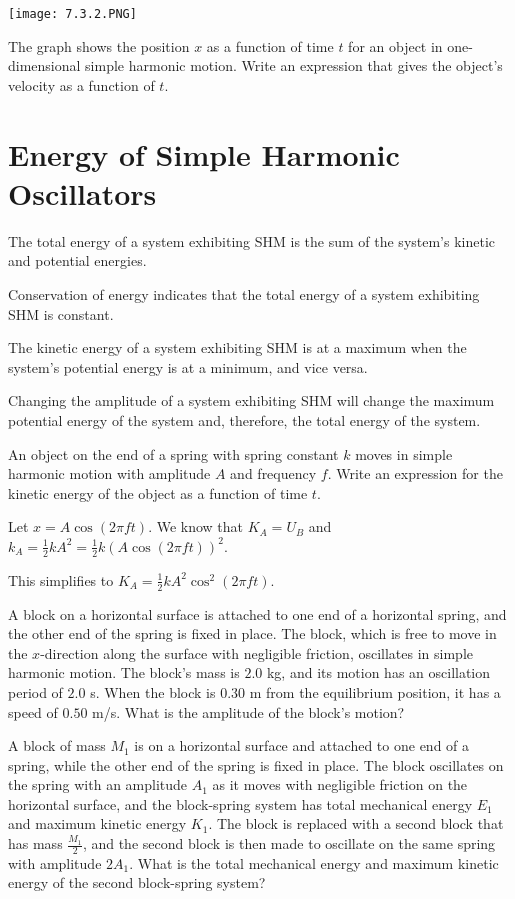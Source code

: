 \documentclass[../mech.tex]{subfiles}
\begin{document}
\ex 
\begin{center}
    \texttt{[image: 7.3.2.PNG]}
\end{center}
The graph shows the position $x$ as a function of time $t$ for an object in one-dimensional simple harmonic motion. Write an expression that gives the object's velocity as a function of $t$.

\section{Energy of Simple Harmonic Oscillators}
The total energy of a system exhibiting SHM is the sum of the system's kinetic and potential energies.

Conservation of energy indicates that the total energy of a system exhibiting SHM is constant.

The kinetic energy of a system exhibiting SHM is at a maximum when the system's potential energy is at a minimum, and vice versa.

Changing the amplitude of a system exhibiting SHM will change the maximum potential energy of the system and, therefore, the total energy of the system.

\begin{example}
    An object on the end of a spring with spring constant $k$ moves in simple harmonic motion with amplitude $A$ and frequency $f$. Write an expression for the kinetic energy of the object as a function of time $t$.

    Let $x=A\cos (2\pi ft)$. We know that $K_A=U_B$ and $k_A=\frac{1}{2}kA^2=\frac{1}{2}k(A\cos(2\pi ft))^2$.

    This simplifies to $K_A=\frac{1}{2}kA^2\cos^2 (2\pi ft)$.
\end{example}

\ex A block on a horizontal surface is attached to one end of a horizontal spring, and the other end of the spring is fixed in place. The block, which is free to move in the $x$-direction along the surface with negligible friction, oscillates in simple harmonic motion.
The block's mass is $2.0$ kg, and its motion has an oscillation period of $2.0$ s. When the block is $0.30$ m from the equilibrium position, it has a speed of $0.50$ m/s. What is the amplitude of the block's motion?

\pagebreak
\ex A block of mass $M_1$ is on a horizontal surface and attached to one end of a spring, while the other end of the spring is fixed in place. The block oscillates on the spring with an amplitude $A_1$ as it moves with negligible friction 
on the horizontal surface, and the block-spring system has total mechanical energy $E_1$ and maximum kinetic energy $K_1$. The block is replaced with a second block that has mass $\frac{M_1}{2}$, and the second block 
is then made to oscillate on the same spring with amplitude $2A_1$. What is the total mechanical energy and maximum kinetic energy of the second block-spring system?
\end{document}
